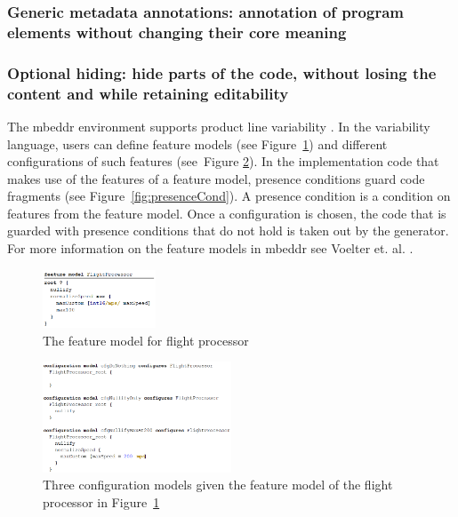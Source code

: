 \documentclass[preprint,numbers,10pt]{sigplanconf}
\begin{document}
\subsubsection{Generic metadata annotations: annotation of program elements without changing their core meaning}
\subsubsection{Optional hiding: hide parts of the code, without losing the content and while retaining editability}
The mbeddr environment supports product line variability \cite{voelter2015using}. In the variability language, users can define
feature models (see Figure~\ref{fig:featureModel}) and
different configurations of such features (see~Figure \ref{fig:configs}).
In the implementation code that makes use of the features of a feature model, presence conditions guard
code fragments (see Figure~\ref{fig:presenceCond}). A presence condition is a condition on features from the feature model. 
Once a configuration is chosen, the code that is guarded with presence conditions that do not hold is taken out by the generator.
For more information on the feature models in mbeddr see Voelter et. al. \cite{voelter2013mbeddr}.

\begin{figure}[H]
	\centering
	\includegraphics[width=0.30\textwidth]{screens/FeatureModelFlightProcessor.png}
	\caption{The feature model for flight processor}
	\label{fig:featureModel}
\end{figure}

\begin{figure}[H]
	\centering
	\includegraphics[width=0.50\textwidth]{screens/ConfigurationModels}
	\caption{Three configuration models given the feature model of the flight processor in Figure~\ref{fig:featureModel}}
	\label{fig:configs}
\end{figure}
\end{document}
